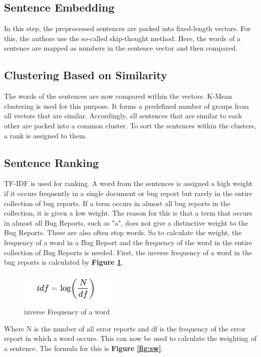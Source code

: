 \documentclass[a4paper,10pt, bibliography=totocnumbered]{scrreprt}
\begin{document}
\subsection{Sentence Embedding}
In this step, the preprocessed sentences are packed into fixed-length vectors. For this, the authors use the so-called skip-thought method. Here, the words of a sentence are mapped as numbers in the sentence vector and then compared.
\subsection{Clustering Based on Similarity}
The words of the sentences are now compared within the vectors. K-Mean clustering is used for this purpose. It forms a predefined number of groups from all vectors that are similar. Accordingly, all sentences that are similar to each other are packed into a common cluster. To sort the sentences within the clusters, a rank is assigned to them.
\subsection{Sentence Ranking}
TF-IDF is used for ranking. A word from the sentences is assigned a high weight if it occurs frequently in a single document or bug report but rarely in the entire collection of bug reports. If a term occurs in almost all bug reports in the collection, it is given a low weight. The reason for this is that a term that occurs in almost all Bug Reports, such as "a", does not give a distinctive weight to the Bug Reports. These are also often stop words. So to calculate the weight, the frequency of a word in a Bug Report and the frequency of the word in the entire collection of Bug Reports is needed.  First, the inverse frequency of a word in the bug reports is calculated by \textbf{Figure \ref{fig:simi}}.

\begin{figure}
\centering
\includegraphics[scale=0.65]{../images/Thema10_idf.PNG}
\caption{inverse Frequency of a word}
\label{fig:simi}
\end{figure} 

Where N is the number of all error reports and df is the frequency of the error report in which a word occurs. This can now be used to calculate the weighting of a sentence. The formula for this is \textbf{Figure \ref{fig:sw}}.
\end{document}
